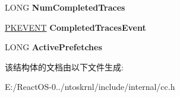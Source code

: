 \begin{DoxyCompactItemize}
\mbox{\label{struct___p_f_s_n___p_r_e_f_e_t_c_h_e_r___g_l_o_b_a_l_s_a7fa529f0d360cf183ff9f88e18412406}} 
L\+O\+NG {\bfseries Num\+Completed\+Traces}
\item 
\mbox{\label{struct___p_f_s_n___p_r_e_f_e_t_c_h_e_r___g_l_o_b_a_l_s_a2a465df66d27d3ee5760c4270cf081b8}} 
\hyperlink{struct___k_e_v_e_n_t}{P\+K\+E\+V\+E\+NT} {\bfseries Completed\+Traces\+Event}
\item 
\mbox{\label{struct___p_f_s_n___p_r_e_f_e_t_c_h_e_r___g_l_o_b_a_l_s_a5f4559877fff9d149567a380ab535a86}} 
L\+O\+NG {\bfseries Active\+Prefetches}
\end{DoxyCompactItemize}


该结构体的文档由以下文件生成\+:\begin{DoxyCompactItemize}
\item 
E\+:/\+React\+O\+S-\/0../ntoskrnl/include/internal/cc.\+h\end{DoxyCompactItemize}
